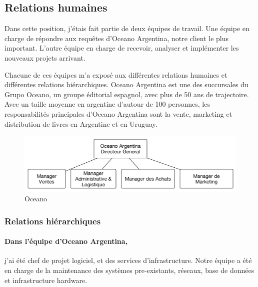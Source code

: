 \documentclass{resume} %
\begin{document}

\subsection{Relations humaines} 

Dans cette position, j'étais fait partie de deux équipes de travail. Une équipe en charge de répondre aux  requêtes d'Oceano Argentina,  notre client le plus important. 
L'autre équipe en charge de recevoir, analyser et implémenter les nouveaux projets arrivant. 

Chacune de ces équipes m'a exposé aux différentes relations humaines et différentes relations hiérarchiques.  
Oceano Argentina est une des succursales du Grupo Oceano, un groupe éditorial espagnol, avec plus de 50 ans de trajectoire. 
Avec un taille moyenne en argentine d'autour de 100 personnes, les responsabilités principales d'Oceano Argentina sont la vente, marketing et distribution de livres en Argentine et en Uruguay. 


 \begin{figure}[!htp]
 \begin{center}
 \includegraphics[width=0.60\linewidth]{oceano.pdf}
 \caption{Oceano}
 \end{center}
 \end{figure}

	
	\subsubsection{Relations hiérarchiques} 
	

		\paragraph{Dans l'équipe d'Oceano Argentina,} j'ai été chef de projet logiciel, et des services d'infrastructure.  Notre équipe a été en charge de la maintenance des systèmes pre-existants, réseaux, base de données et infrastructure hardware. 
		
\end{document}
